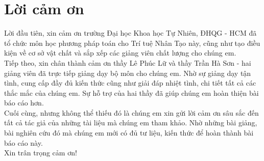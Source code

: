 \chapter*{Lời cảm ơn}
Lời đầu tiên, xin cảm ơn trường Đại học Khoa học Tự Nhiên, ĐHQG - HCM đã tổ chức môn học phương pháp toán cho Trí tuệ Nhân Tạo này, cũng như tạo điều kiện về cơ sở vật chất và sắp xếp các giảng viên chất lượng cho chúng em.\\

\noindent Tiếp theo, xin chân thành cảm ơn thầy Lê Phúc Lữ và thầy Trần Hà Sơn - hai giảng viên đã trực tiếp giảng dạy bộ môn cho chúng em. Nhờ sự giảng dạy tận tình, cung cấp đầy đủ kiến thức cũng như giải đáp nhiệt tình, chi tiết tất cả các thắc mắc của chúng em. Sự hỗ trợ của hai thầy đã giúp chúng em hoàn thiện bài báo cáo hơn.\\

\noindent Cuối cùng, nhưng không thể thiếu đó là chúng em xin gửi lời cảm ơn sâu sắc đến tất cả tác giả của những tài liệu mà chúng em tham khảo. Nhờ những bài giảng, bài nghiên cứu đó mà chúng em mới có đủ tư liệu, kiến thức để hoàn thành bài báo cáo này.\\

\noindent Xin trân trọng cảm ơn!